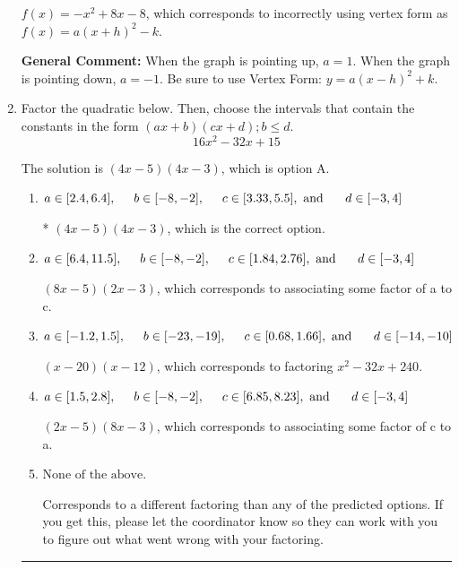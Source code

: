 \documentclass{extbook}[14pt]
\newcommand{\litem}[1]{\item #1

\rule{\textwidth}{0.4pt}}
\begin{document}
\begin{enumerate}
{\begin{enumerate}[label=\Alph*.]
$f(x)=-x^{2} +8 x -8$, which corresponds to incorrectly using vertex form as $f(x) = a(x+h)^2 - k$.
\end{enumerate}

\textbf{General Comment:} When the graph is pointing up, $a=1$. When the graph is pointing down, $a=-1$. Be sure to use Vertex Form: $y = a(x-h)^2+k$.
}
\litem{
Factor the quadratic below. Then, choose the intervals that contain the constants in the form $(ax+b)(cx+d); b \leq d.$
\[ 16x^{2} -32 x + 15 \]

The solution is \( (4x -5)(4x -3) \), which is option A.\begin{enumerate}[label=\Alph*.]
\item \( a \in [2.4, 6.4], \hspace*{5mm} b \in [-8, -2], \hspace*{5mm} c \in [3.33, 5.5], \text{ and } \hspace*{5mm} d \in [-3, 4] \)

* $(4x -5)(4x -3)$, which is the correct option.
\item \( a \in [6.4, 11.5], \hspace*{5mm} b \in [-8, -2], \hspace*{5mm} c \in [1.84, 2.76], \text{ and } \hspace*{5mm} d \in [-3, 4] \)

 $(8x -5)(2x -3)$, which corresponds to associating some factor of a to c.
\item \( a \in [-1.2, 1.5], \hspace*{5mm} b \in [-23, -19], \hspace*{5mm} c \in [0.68, 1.66], \text{ and } \hspace*{5mm} d \in [-14, -10] \)

 $(x -20)(x -12)$, which corresponds to factoring $x^{2} -32 x + 240$.
\item \( a \in [1.5, 2.8], \hspace*{5mm} b \in [-8, -2], \hspace*{5mm} c \in [6.85, 8.23], \text{ and } \hspace*{5mm} d \in [-3, 4] \)

 $(2x -5)(8x -3)$, which corresponds to associating some factor of c to a.
\item \( \text{None of the above.} \)

 Corresponds to a different factoring than any of the predicted options. If you get this, please let the coordinator know so they can work with you to figure out what went wrong with your factoring.
\end{enumerate}

}
\end{enumerate}
\end{document}
